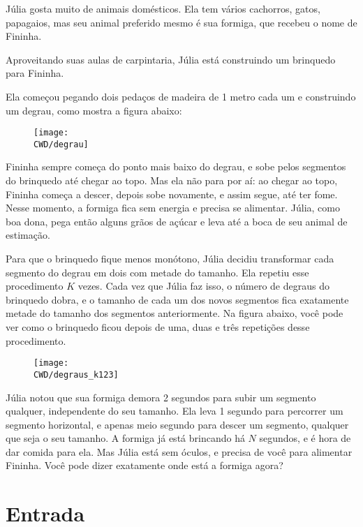Júlia gosta muito de animais domésticos.
 Ela tem vários cachorros, gatos, papagaios, mas seu animal preferido mesmo é sua formiga, que recebeu o nome de Fininha.


Aproveitando suas aulas de carpintaria, Júlia está construindo um brinquedo para Fininha.

Ela começou pegando dois pedaços de madeira de 1 metro cada um e construindo um degrau,
como mostra a figura abaixo:

\begin{figure}[h]
\begin{center}
  \texttt{[image: \\CWD/degrau]}
\end{center}
\end{figure}

Fininha sempre começa do ponto mais baixo do degrau, e sobe pelos segmentos do brinquedo até chegar ao topo.
 Mas ela não para por aí: ao chegar ao topo, Fininha começa a descer, depois sobe novamente, e assim segue, até ter fome.
 Nesse momento, a formiga fica sem energia e precisa se alimentar.
 Júlia, como boa dona, pega então alguns grãos de açúcar e leva até a boca de seu animal de estimação.


Para que o brinquedo fique menos monótono, Júlia decidiu transformar cada segmento do degrau em dois com metade do tamanho.
 Ela repetiu esse procedimento $K$ vezes.
 Cada vez que Júlia faz isso, o número de degraus do brinquedo dobra, e o tamanho de cada um dos novos segmentos fica exatamente metade do tamanho dos segmentos anteriormente.
 Na figura abaixo, você pode ver como o brinquedo ficou depois de uma, duas e três repetições desse procedimento.


\begin{figure}[h]
\begin{center}
  \texttt{[image: \\CWD/degraus\_k123]}
\end{center}
\end{figure}

Júlia notou que sua formiga demora 2 segundos para subir um segmento qualquer, independente do seu tamanho.
 Ela leva 1 segundo para percorrer um segmento horizontal, e apenas meio segundo para descer um segmento, qualquer que seja o seu tamanho.
 A formiga já está brincando há $N$ segundos, e é hora de dar comida para ela.
 Mas Júlia está sem óculos, e precisa de você para alimentar Fininha.
 Você pode dizer exatamente onde está a formiga agora?

\section*{Entrada}

